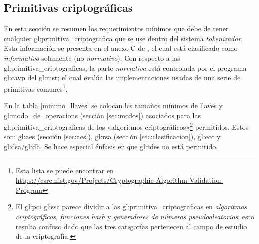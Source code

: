 %
%

\subsection{Primitivas criptográficas}
\label{sec:primitivas}

En esta sección se resumen los requerimientos mínimos que debe de tener
cualquier \gls{gl:primitiva_criptografica} que se use dentro del sistema
\textit{tokenizador}. Esta información se presenta en el anexo C de
\cite{pci_tokens}, el cual está clasificado como \textit{informativo} solamente
(no \textit{normativo}). Con respecto a las \glspl{gl:primitiva_criptografica},
la parte \textit{normativa} está controlada por el programa \gls{gl:cavp} del
\gls{gl:nist}; el cual evalúa las implementaciones usadas de una serie de
primitivas comunes\footnote{Esta lista se puede encontrar en
\url{https://csrc.nist.gov/Projects/Cryptographic-Algorithm-Validation-Program}}.

En la tabla \ref{minimo_llaves} se colocan los tamaños mínimos de llaves y
\glspl{gl:modo_de_operacion} (sección \ref{sec:modos}) asociados
para las \glspl{gl:primitiva_criptografica} de los «algoritmos
criptográficos»\footnote{El \gls{gl:pci} \gls{gl:ssc} parece dividir a las
\glspl{gl:primitiva_criptografica} en \textit{algoritmos criptográficos},
\textit{funciones hash} y \textit{generadores de números pseudoaleatorios};
esto resulta confuso dado que las tres categorías pertenecen al campo de
estudio de la criptografía.} permitidos. Estos son: \gls{gl:aes} (sección
\ref{sec:aes}), \gls{gl:rsa} (sección \ref{sec:clasificacion}), \gls{gl:ecc} y
\gls{gl:dsa}/\gls{gl:dh}. Se hace especial énfasis en que \gls{gl:tdes} no
está permitido.



